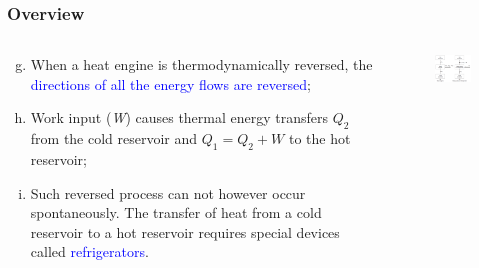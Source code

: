 \documentclass[10pt,compress,handout,ignorenonframetext]{beamer}
\begin{document}
\begin{frame}
 \frametitle{Overview}
  \begin{columns}
   \begin{column}[c]{0.45\linewidth}
    \begin{enumerate}[(a)] \setcounter{enumi}{6}
     \item <1-> When a heat engine is thermodynamically reversed, the \textcolor{blue}{directions of all the energy flows are reversed};
     \item <2-> Work input ({\it W}) causes thermal energy transfers $Q_{2}$ from the cold reservoir and $Q_{1}=Q_{2}+W$ to the hot reservoir; 
     \item <3-> Such reversed process can not however occur spontaneously. The transfer of heat from a cold reservoir to a hot reservoir requires special devices called \textcolor{blue}{refrigerators}.
    \end{enumerate}
   \end{column}
   \begin{column}[c]{0.55\linewidth}
    \begin{figure}%
     \begin{center}
      \includegraphics[width=6.5cm,clip]{./Pics/Overview_Refrig1}
     \end{center}
    \end{figure}  
   \end{column}  
  \end{columns}
\end{frame}
\end{document}
